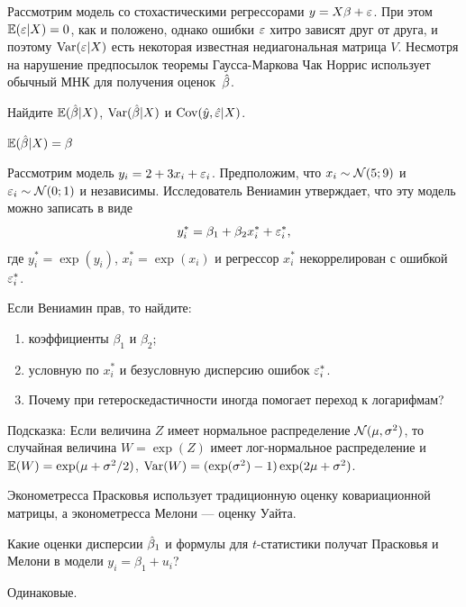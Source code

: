 \begin{problem}
Рассмотрим модель со стохастическими регрессорами $y=X\beta + \varepsilon$. При этом $\mathbb{E}(\varepsilon|X)=0$, как и положено, однако ошибки $\varepsilon$ хитро зависят друг от друга, и поэтому $\operatorname{Var}(\varepsilon|X)$ есть некоторая известная недиагональная матрица $V$. Несмотря на нарушение предпосылок теоремы Гаусса-Маркова Чак Норрис использует обычный МНК для получения оценок~$\hat{\beta}$.

Найдите $\mathbb{E}(\hat{\beta}|X)$, $\operatorname{Var}(\hat{\beta}|X)$ и $\operatorname{Cov}(\hat{y}, \hat{\varepsilon} | X)$.
\begin{sol}
$\mathbb{E}(\hat{\beta}|X)=\beta$
\end{sol}
\end{problem}





\begin{problem}
Рассмотрим модель $y_i = 2 + 3x_i + \varepsilon_i$. Предположим, что $x_i \sim \mathcal{N}(5;9)$ и $\varepsilon_i \sim \mathcal{N}(0;1)$ и независимы. Исследователь Вениамин утверждает, что эту модель можно записать в виде
\[
y_i^* = \beta_1 + \beta_2 x_i^* + \varepsilon_i^*,
\]
где $y_i^*=\exp(y_i)$, $x_i^*=\exp(x_i)$ и регрессор $x_i^*$ некоррелирован с ошибкой $\varepsilon_i^*$.

Если Вениамин прав, то найдите:

\begin{enumerate}
\item коэффициенты $\beta_1$ и $\beta_2$;
\item условную по $x_i^*$ и безусловную дисперсию ошибок $\varepsilon_i^*$.
\item Почему при гетероскедастичности иногда помогает переход к логарифмам?
\end{enumerate}

Подсказка: Если величина $Z$ имеет нормальное распределение $\mathcal{N}(\mu, \sigma^2)$, то случайная величина $W=\exp(Z)$ имеет лог-нормальное распределение и $\mathbb{E}(W)=\exp(\mu + \sigma^2/2)$, $\operatorname{Var}(W)=(\exp(\sigma^2)-1)\exp(2\mu+\sigma^2)$.


\begin{sol}

\end{sol}
\end{problem}




\begin{problem}
Эконометресса Прасковья использует традиционную оценку ковариационной матрицы, а эконометресса Мелони — оценку Уайта.

Какие оценки дисперсии $\hat{\beta}_1$ и формулы для $t$-статистики получат Прасковья и Мелони в модели $y_i = \beta_1 + u_i$?
\begin{sol}
Одинаковые.
\end{sol}
\end{problem}

